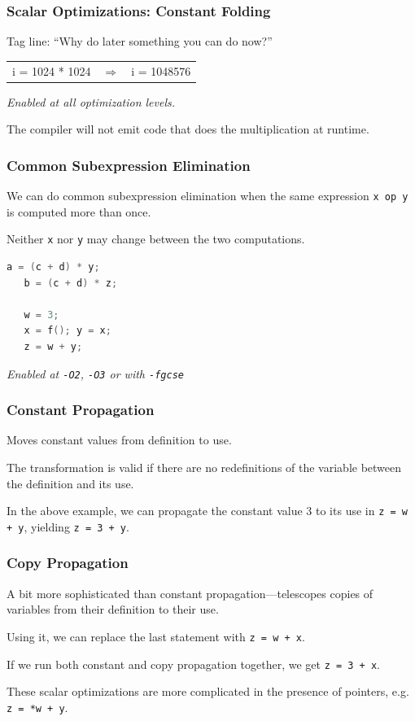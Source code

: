 \begin{frame}
\frametitle{Scalar Optimizations: Constant Folding}

Tag line: ``Why do later something you can do now?''

\begin{center}
\vspace*{-1em}
\begin{tabular}{lll}
i = 1024 * 1024 &
$\Longrightarrow$ &
i = 1048576
\end{tabular}
\end{center}

\noindent \emph{Enabled at all optimization levels.} 

The compiler will not emit code that does the multiplication at runtime.

\end{frame}


\begin{frame}[fragile]
\frametitle{Common Subexpression Elimination}

We can do common subexpression elimination
when the same expression {\tt x~op~y} is computed more than once. 

Neither {\tt x} nor {\tt y} may change between the two computations. 

\begin{lstlisting}[language=C]
   a = (c + d) * y;
   b = (c + d) * z;

   w = 3;
   x = f(); y = x;
   z = w + y;

\end{lstlisting}

\emph{Enabled at {\tt -O2}, {\tt -O3} or with {\tt -fgcse}}

\end{frame}

\begin{frame}
\frametitle{Constant Propagation}

Moves constant values from definition to
use. 

The transformation is valid if there are no redefinitions of the
variable between the definition and its use.

 In the above example,
we can propagate the constant value 3 to its use in {\tt z = w + y},
yielding {\tt z = 3 + y}.



\end{frame}

\begin{frame}
\frametitle{Copy Propagation}

A bit more sophisticated than constant
propagation---telescopes copies of variables from their definition to
their use. 

Using it, we can replace the
last statement with {\tt z = w + x}. 

If we run both constant and copy
propagation together, we get {\tt z = 3 + x}.

These scalar optimizations are more complicated in the presence
of pointers, e.g. {\tt z = *w + y}.

\end{frame}


